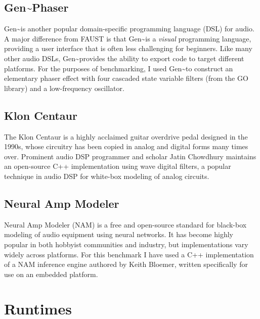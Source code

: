 
\subsection{ Gen\textasciitilde \space Phaser }

Gen\textasciitilde \space is another popular domain-specific programming language (DSL) for audio. A major difference from FAUST is that Gen\textasciitilde \space is a \textit{visual} programming language, providing a user interface that is often less challenging for beginners. Like many other audio DSLs, Gen\textasciitilde \space provides the ability to export code to target different platforms. For the purposes of benchmarking, I used Gen\textasciitilde \space to construct an elementary phaser effect with four cascaded state variable filters (from the GO library\cite{BD0831917X}) and a low-frequency oscillator.

\subsection{ Klon Centaur }

The Klon Centaur is a highly acclaimed guitar overdrive pedal designed in the 1990s, whose circuitry has been copied in analog and digital forms many times over\cite{chowdhury2020comparison}. Prominent audio DSP programmer and scholar Jatin Chowdhury maintains an open-source C++ implementation using wave digital filters, a popular technique in audio DSP for white-box modeling of analog circuits.

\subsection{ Neural Amp Modeler }

Neural Amp Modeler (NAM)\cite{neuralampmodeler} is a free and open-source standard for black-box modeling of audio equipment using neural networks. It has become highly popular in both hobbyist communities and industry, but implementations vary widely across platforms. For this benchmark I have used a C++ implementation of a NAM inference engine authored by Keith Bloemer\cite{guitarml_mercury}, written specifically for use on an embedded platform.


\section{ Runtimes }

